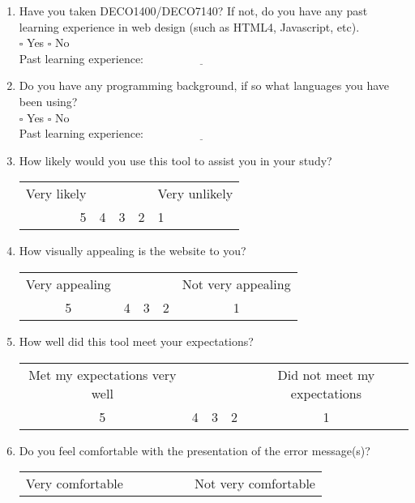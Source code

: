\documentclass[11pt]{article}
\begin{document}
\begin{enumerate}
\item Have you taken DECO1400/DECO7140? If not, do you have any past learning experience in web design (such as HTML4, Javascript, etc). \\ $\square$ Yes $\square$ No \\ Past learning experience: $\underline{\hspace{4cm}}$
\item Do you have any programming background, if so what languages you have been using? \\ $\square$ Yes $\square$ No \\ Past learning experience: $\underline{\hspace{4cm}}$
\item How likely would you use this tool to assist you in your study? \\ 
\begin{center}
\begin{tabular}{r | c | c | c | l}
Very likely & ~ & ~ & ~ & Very unlikely \\
5 & 4 & 3 & 2 & 1
\end{tabular}
\end{center}
\item How visually appealing is the website to you? \\
\begin{center}
\begin{tabular}{c | c | c | c | c}
Very appealing & ~ & ~ & ~ & Not very appealing \\
5 & 4 & 3 & 2 & 1
\end{tabular}
\end{center}
\item How well did this tool meet your expectations? \\
\begin{center}
\begin{tabular}{c | c | c | c | c}
Met my expectations very well & ~ & ~ & ~ & Did not meet my expectations \\
5 & 4 & 3 & 2 & 1
\end{tabular}
\end{center}
\item Do you feel comfortable with the presentation of the error message(s)? \\
\begin{center}
\begin{tabular}{c | c | c | c | c}
Very comfortable & ~ & ~ & ~ & Not very comfortable \\

\end{tabular}
\end{center}
\end{enumerate}
\end{document}
